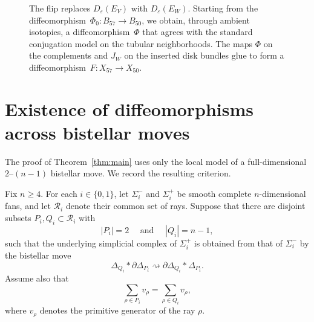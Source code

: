 \documentclass{amsart}
\numberwithin{equation}{section}
\theoremstyle{definition}
\newcommand{\cR}{\mathcal R}
\newcommand{\wideand}{ \quad \text{ and } \quad }
\DeclareMathOperator{\Int}{Int}
\begin{document}
\begin{figure}[t]

    \caption{
        The flip replaces $D_\varepsilon(E_V)$ with $D_\varepsilon(E_W)$.
        Starting from the diffeomorphism~$\Phi_0\colon B_{57}\to B_{50}$, we obtain, through ambient isotopies, a diffeomorphism~$\Phi$ that agrees with the standard conjugation model on the tubular neighborhoods.
        The maps $\Phi$ on the complements and $J_W$ on the inserted disk bundles glue to form a diffeomorphism~$F\colon X_{57}\to X_{50}$.
    }
    \label{fig:flip-surgery}
\end{figure}


\section{Existence of diffeomorphisms across bistellar moves}

The proof of Theorem~\ref{thm:main} uses only the local model of a full-dimensional $2$--$(n-1)$ bistellar move. 
We record the resulting criterion.

Fix $n\ge 4$. 
For each $i\in\{0,1\}$, let $\Sigma_i^-$ and $\Sigma_i^+$ be smooth complete $n$-dimensional fans, and let $\cR_i$ denote their common set of rays.
Suppose that there are disjoint subsets $P_i,Q_i\subset\cR_i$ with 
$$
    |P_i|=2 \wideand |Q_i|=n-1,
$$
such that the underlying simplicial complex of $\Sigma_i^+$ is obtained from that of $\Sigma_i^-$ by the bistellar move
$$
    \Delta_{Q_i}*\partial\Delta_{P_i} \rightsquigarrow \partial\Delta_{Q_i}*\Delta_{P_i}.
$$
Assume also that
$$
    \sum_{\rho\in P_i}v_\rho =\sum_{\rho\in Q_i}v_\rho,
$$
where $v_\rho$ denotes the primitive generator of the ray $\rho$.
\end{document}
